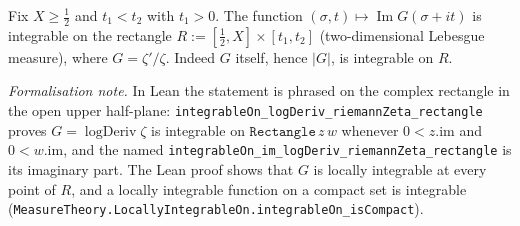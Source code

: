\begin{lemma}
\label{lem:lb_logDeriv_integrable}
\leanok
{}
Fix $X\ge\tfrac12$ and $t_1<t_2$ with $t_1>0$. The function
$(\sigma,t)\mapsto\operatorname{Im}G(\sigma+it)$ is integrable on the rectangle
$R:=[\tfrac12,X]\times[t_1,t_2]$ (two-dimensional Lebesgue measure), where
$G=\zeta'/\zeta$. Indeed $G$ itself, hence $|G|$, is integrable on $R$.

\emph{Formalisation note.} In Lean the statement is phrased on the complex
rectangle in the open upper half-plane: \texttt{integrableOn\_logDeriv\_riemannZeta\_rectangle}
proves $G=\operatorname{logDeriv}\zeta$ is integrable on $\texttt{Rectangle}\,z\,w$ whenever
$0<z.\mathrm{im}$ and $0<w.\mathrm{im}$, and the named
\texttt{integrableOn\_im\_logDeriv\_riemannZeta\_rectangle} is its imaginary part. The Lean
proof shows that $G$ is locally integrable at every point of $R$, and a locally integrable
function on a compact set is integrable
(\texttt{MeasureTheory.LocallyIntegrableOn.integrableOn\_isCompact}).
\end{lemma}

